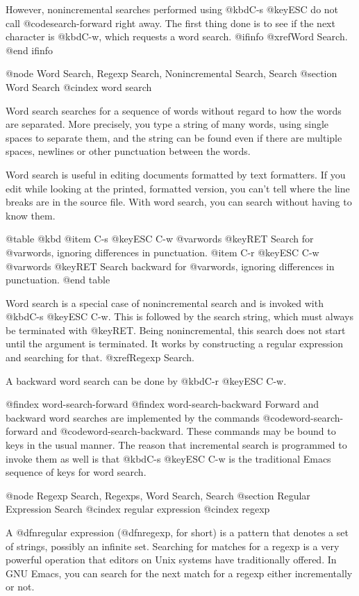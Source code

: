 {{{{{{{{  However, nonincremental searches performed using @kbd{C-s @key{ESC}} do
not call @code{search-forward} right away.  The first thing done is to see
if the next character is @kbd{C-w}, which requests a word search.
@ifinfo
@xref{Word Search}.
@end ifinfo

@node Word Search, Regexp Search, Nonincremental Search, Search
@section Word Search
@cindex word search

  Word search searches for a sequence of words without regard to how the
words are separated.  More precisely, you type a string of many words,
using single spaces to separate them, and the string can be found even if
there are multiple spaces, newlines or other punctuation between the words.

  Word search is useful in editing documents formatted by text formatters.
If you edit while looking at the printed, formatted version, you can't tell
where the line breaks are in the source file.  With word search, you can
search without having to know them.

@table @kbd
@item C-s @key{ESC} C-w @var{words} @key{RET}
Search for @var{words}, ignoring differences in punctuation.
@item C-r @key{ESC} C-w @var{words} @key{RET}
Search backward for @var{words}, ignoring differences in punctuation.
@end table

  Word search is a special case of nonincremental search and is invoked
with @kbd{C-s @key{ESC} C-w}.  This is followed by the search string, which
must always be terminated with @key{RET}.  Being nonincremental, this
search does not start until the argument is terminated.  It works by
constructing a regular expression and searching for that.  @xref{Regexp
Search}.

  A backward word search can be done by @kbd{C-r @key{ESC} C-w}.

@findex word-search-forward
@findex word-search-backward
  Forward and backward word searches are implemented by the commands
@code{word-search-forward} and @code{word-search-backward}.  These commands
may be bound to keys in the usual manner.  The reason that incremental
search is programmed to invoke them as well is that @kbd{C-s @key{ESC} C-w}
is the traditional Emacs sequence of keys for word search.

@node Regexp Search, Regexps, Word Search, Search
@section Regular Expression Search
@cindex regular expression
@cindex regexp

  A @dfn{regular expression} (@dfn{regexp}, for short) is a pattern that
denotes a set of strings, possibly an infinite set.  Searching for matches
for a regexp is a very powerful operation that editors on Unix systems have
traditionally offered.  In GNU Emacs, you can search for the next match for
a regexp either incrementally or not.

}}}}}}}}
